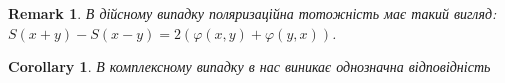 \documentclass[a4paper, 10pt]{article}
\theoremstyle{theoremdd}
\newtheorem{remark}[theorem]{Remark}
\newtheorem{corollary}[theorem]{Corollary}
\begin{document}
\begin{remark}
В дійсному випадку поляризаційна тотожність має такий вигляд:\\
$S(x+y) - S(x-y) = 2 (\varphi(x,y) + \varphi(y,x))$.
\end{remark}

\begin{corollary}
В комплексному випадку в нас виникає однозначна відповідність\\
\end{corollary}
\end{document}
